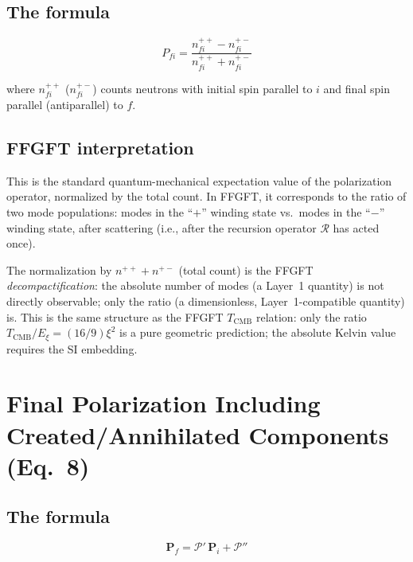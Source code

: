 \subsection*{The formula}

\begin{equation}
  P_{fi} = \frac{n_{fi}^{++} - n_{fi}^{+-}}{n_{fi}^{++} + n_{fi}^{+-}}
  \tag{Paper~Eq.~7}
\end{equation}

\noindent where $n_{fi}^{++}$ ($n_{fi}^{+-}$) counts neutrons with initial
spin parallel to $i$ and final spin parallel (antiparallel) to $f$.

\subsection*{FFGFT interpretation}

This is the standard quantum-mechanical expectation value of the
polarization operator, normalized by the total count. In FFGFT, it
corresponds to the ratio of two mode populations: modes in the ``$+$''
winding state vs.\ modes in the ``$-$'' winding state, after scattering
(i.e., after the recursion operator $\mathcal{R}$ has acted once).

The normalization by $n^{++} + n^{+-}$ (total count) is the FFGFT
\emph{decompactification}: the absolute number of modes (a Layer~1
quantity) is not directly observable; only the ratio (a dimensionless,
Layer~1-compatible quantity) is. This is the same structure as the
FFGFT $T_{\mathrm{CMB}}$ relation: only the ratio $T_{\mathrm{CMB}}/E_\xi = (16/9)\xi^2$
is a pure geometric prediction; the absolute Kelvin value requires
the SI embedding.

\section{Final Polarization Including Created/Annihilated Components (Eq.~8)}

\subsection*{The formula}

\begin{equation}
  \mathbf{P}_f = \mathcal{P}'\,\mathbf{P}_i + \mathcal{P}''
  \tag{Paper~Eq.~8}
\end{equation}

